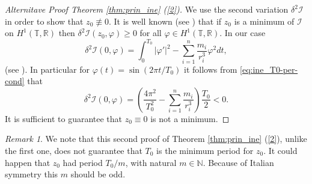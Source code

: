 \documentclass[twoside]{article}
\theoremstyle{remark}
\newtheorem{comentario}{Remark}
\newcommand{\rr}{\mathbb{R}}
\begin{document}
\begin{proof}[Alternitave Proof Theorem \ref{thm:prin_ine} (\ref{2})]
We use the second variation $\delta^2 \mathcal{I}$ in order to show  that $z_0\nequiv 0$. It is well known (see \cite[Th. 1.3.1]{jost1998calculus}) that if $z_0$ is a minimum of $\mathcal{I}$ on $H^1(\mathbb{T},\rr)$  then $\delta^2 \mathcal{I} (z_0,\varphi)\geq 0$ for all $\varphi\in H^1(\mathbb{T},\rr)$. In our case
\[\delta^2\mathcal{I}(0,\varphi)=\int_0^{T_0} |\varphi'|^2-\sum_{i=1}^{n}\frac{m_i}{r_i^3}\varphi^2 dt,\]
(see \cite[Eq. 1.3.6]{jost1998calculus}). In particular for $\varphi(t)=\sin (2\pi t/T_0)$ it follows from \eqref{eq:ine_T0-per-cond}  that
\begin{equation}\label{eq:form.delta2}
 \delta^2 \mathcal{I} (0,\varphi)=\left( \frac{4\pi^2}{T_0^2}-\sum_{i=1}^{n}\frac{m_i}{r_i^3} \right)\frac{T_0}{2}<0.
\end{equation}
It is sufficient  to guarantee that $z_0\equiv 0$ is not a minimum.
\end{proof}

\begin{comentario}
We note that this second proof of Theorem \ref{thm:prin_ine} (\ref{2}), unlike the first one, does not guarantee that $T_0$ is the minimum period for $z_0$. It could happen that $z_0$ had period $T_0/m$, with natural $m\in\mathbb{N}$. Because of Italian symmetry this $m$ should be odd.
\end{comentario}
\end{document}
